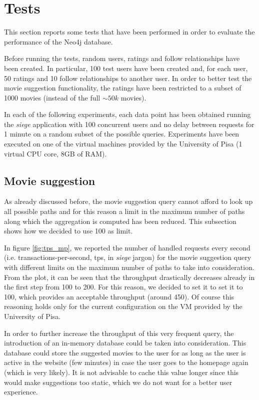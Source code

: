 \documentclass[11pt]{article}
\begin{document}
\section{Tests}
This section reports some tests that have been performed in order to evaluate 
the performance of the Neo4j database.

Before running the tests, random users, ratings and follow relationships have 
been created. In particular, 100 test users have been created and, for each 
user, 50 ratings and 10 follow relationships to another user. In order to 
better test the movie suggestion functionality, the ratings have been restricted
to a subset of 1000 movies (instead of the full $\sim50k$ movies).

In each of the following experiments, each data point has been obtained running 
the \emph{siege} application with 100 concurrent users and no delay between 
requests for 1 minute on a random subset of the possible queries. Experiments 
have been executed on one of the virtual machines provided by the University 
of Pisa (1 virtual CPU core, 8GB of RAM).

\subsection{Movie suggestion}
As already discussed before, the movie suggestion query cannot afford to look
up all possible paths and for this reason a limit in the maximum number of paths
along which the aggregation is computed has been reduced. This subsection 
shows how we decided to use 100 as limit.

In figure \ref{fig:tps_mp}, we reported the number of handled requests every 
second (i.e. transactions-per-second, tps, in \emph{siege} jargon) for the 
movie suggestion query with different limits on the maximum number of paths to 
take into consideration. From the plot, it can be seen that the throughput 
drastically decreases already in the first step from 100 to 200. For this 
reason, we decided to set it to set it to 100, which provides an acceptable 
throughput (around 450). Of course this reasoning holds only for the current 
configuration on the VM provided by the University of Pisa.

In order to further increase the throughput of this very frequent query, the 
introduction of an in-memory database could be taken into consideration. This database could store the suggested movies to the user for as long as the user is active in the website (few minutes) in case the user goes to the homepage again (which is very likely). It is not advisable to cache this value longer since this would make suggestions too static, which we do not want for a better user experience.
\end{document}
